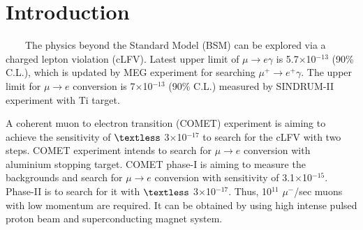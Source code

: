 \documentclass[a4paper, 10pt, twocolumn]{article}
\title{\begin{CJK}{UTF8}{min}\normalsize Radiation study on the Superconducting Solenoid Magnet for $\mu^- \rightarrow e^-$ Conversion Experiment\\
\author{\begin{CJK}{UTF8}{min} ~~~~~~~~~~~~~~~~~~~~~~~~~~~~~~~~~~~~~~~~~~~~~~~~~~~~~~~~~~~~~~~~~~~~~~~~~~~~~~~~~~~~~~~~~~~~~~~~~~~~~~~~~~~~~~~~~~~~~~~~~~~~~                               ~~~$BML(B $B3p(B\end{CJK}}
\date{}
\begin{document}
\maketitle

\section{Introduction}
~~~~The physics beyond the Standard Model (BSM) can be explored via a charged lepton violation (cLFV).
Latest upper limit of $\mu \rightarrow e\gamma$ is 5.7$\times$10$^{-13}$ (90\% C.L.)\cite{meg}, which is updated by MEG experiment for searching $\mu^+ \rightarrow e^+\gamma$.%
The upper limit for $\mu \rightarrow e$ conversion is 7$\times$10$^{-13}$ (90\% C.L.)\cite{sin} measured by SINDRUM-II experiment with Ti target.

A coherent muon to electron transition (COMET) experiment is aiming to achieve the sensitivity of $\textless$ 3$\times$10$^{-17}$ to search for the cLFV with two steps.
COMET experiment intends to search for $\mu \rightarrow e$ conversion with aluminium stopping target.
COMET phase-I is aiming to measure the backgrounds and search for $\mu \rightarrow e$ conversion with sensitivity of 3.1$\times$10$^{-15}$.
Phase-II is to search for it with $\textless$ 3$\times$10$^{-17}$.
Thus, %
10$^{11}$ $\mu^-$/sec muons with low momentum are required.%
It can be obtained by using high intense pulsed proton beam and superconducting magnet system.
\end{document}
